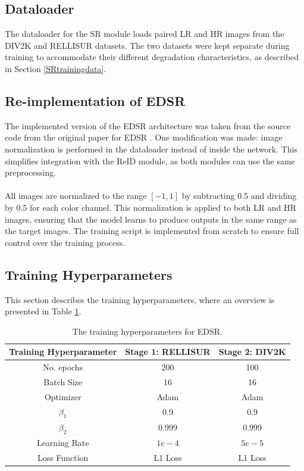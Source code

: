 \subsection{Dataloader}
The dataloader for the \acs{SR} module loads paired \acs{LR} and \acs{HR} images from the \acs{DIV2K} \cite{Agustsson2017NTIRE} and \acs{RELLISUR} \cite{aakerberg2021rellisur} datasets. The two datasets were kept separate during training to accommodate their different degradation characteristics, as described in Section \ref{SRtrainingdata}.

\subsection{Re-implementation of EDSR} \label{sec:implementationedsr}
The implemented version of the \acs{EDSR} architecture was taken from the source code from the original paper for \acs{EDSR} \cite{lim2017edsr}. One modification was made: image normalization is performed in the dataloader instead of inside the network. This simplifies integration with the \acs{ReID} module, as both modules can use the same preprocessing.
\\\\
All images are normalized to the range $[-1, 1]$ by subtracting 0.5 and dividing by 0.5 for each color channel. This normalization is applied to both \acs{LR} and \acs{HR} images, ensuring that the model learns to produce outputs in the same range as the target images. The training script is implemented from scratch to ensure full control over the training process.


\subsection{Training Hyperparameters} \label{edsr_hyperparameters}
This section describes the training hyperparameters, where an overview is presented in Table \ref{tab:edsrtrainingparameters}.
\begin{table}[H]
    \centering
    \begin{tabular}{|c|c|c|}\hline
         \cellcolor[HTML]{D8E9F7} \textbf{Training Hyperparameter}&  \cellcolor[HTML]{D8E9F7} \textbf{Stage 1: RELLISUR}&\cellcolor[HTML]{D8E9F7} \textbf{Stage 2: DIV2K}\\\hline
         No. epochs &  200&100\\\hline
         Batch Size &  16&16\\\hline
         Optimizer &  Adam &Adam\\\hline
 $\beta_1$&0.9 &0.9 \\\hline
 $\beta_2$&0.999 &0.999 \\\hline
         Learning Rate& \(1e-4\) &\(5e-5\)\\\hline
         Loss Function&  L1 Loss&L1 Loss\\ \hline
    \end{tabular}
    \caption{The training hyperparameters for EDSR.}
\label{tab:edsrtrainingparameters}
\end{table}

